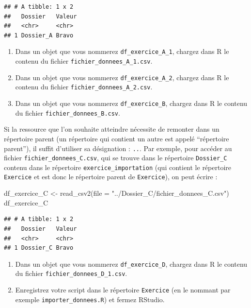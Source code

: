 \documentclass[
  11pt,
]{book}
\newenvironment{Shaded}{\begin{snugshade}}{\end{snugshade}}
\newcommand{\AttributeTok}[1]{\textcolor[rgb]{0.77,0.63,0.00}{#1}}
\newcommand{\FunctionTok}[1]{\textcolor[rgb]{0.00,0.00,0.00}{#1}}
\newcommand{\NormalTok}[1]{#1}
\newcommand{\OtherTok}[1]{\textcolor[rgb]{0.56,0.35,0.01}{#1}}
\newcommand{\StringTok}[1]{\textcolor[rgb]{0.31,0.60,0.02}{#1}}
\providecommand{\tightlist}{%
  \setlength{\itemsep}{0pt}\setlength{\parskip}{0pt}}
\numberwithin{equation}{section}
\numberwithin{countremarque}{section}
\newenvironment{greenbox}{
  \begin{tcolorbox}[breakable, colback=vert,coltext=black,
                  colframe=grisfonce]}
 {\end{tcolorbox}}
\begin{document}
\begin{lstlisting}
## # A tibble: 1 x 2
##   Dossier   Valeur
##   <chr>     <chr> 
## 1 Dossier_A Bravo
\end{lstlisting}

\begin{greenbox}

\begin{enumerate}
\def\labelenumi{\arabic{enumi}.}
\setcounter{enumi}{6}
\tightlist
\item
  Dans un objet que vous nommerez \texttt{df\_exercice\_A\_1}, chargez dans R le contenu du fichier \texttt{fichier\_donnees\_A\_1.csv}.
\item
  Dans un objet que vous nommerez \texttt{df\_exercice\_A\_2}, chargez dans R le contenu du fichier \texttt{fichier\_donnees\_A\_2.csv}.
\item
  Dans un objet que vous nommerez \texttt{df\_exercice\_B}, chargez dans R le contenu du fichier \texttt{fichier\_donnees\_B.csv}.
\end{enumerate}

\end{greenbox}

Si la ressource que l'on souhaite atteindre nécessite de remonter dans un répertoire parent (un répertoire qui contient un autre est appelé ``répertoire parent''), il suffit d'utiliser sa désignation : \texttt{..}. Par exemple, pour accéder au fichier \texttt{fichier\_donnees\_C.csv}, qui se trouve dans le répertoire \texttt{Dossier\_C} contenu dans le répertoire \texttt{exercice\_importation} (qui contient le répertoire \texttt{Exercice} et est donc le répertoire parent de \texttt{Exercice}), on peut écrire :

\begin{Shaded}
\begin{Highlighting}[]
\NormalTok{df\_exercice\_C }\OtherTok{\textless{}{-}} \FunctionTok{read\_csv2}\NormalTok{(}\AttributeTok{file =} \StringTok{"../Dossier\_C/fichier\_donnees\_C.csv"}\NormalTok{)}
\NormalTok{df\_exercice\_C}
\end{Highlighting}
\end{Shaded}

\begin{lstlisting}
## # A tibble: 1 x 2
##   Dossier   Valeur
##   <chr>     <chr> 
## 1 Dossier_C Bravo
\end{lstlisting}

\begin{greenbox}

\begin{enumerate}
\def\labelenumi{\arabic{enumi}.}
\setcounter{enumi}{9}
\tightlist
\item
  Dans un objet que vous nommerez \texttt{df\_exercice\_D}, chargez dans R le contenu du fichier \texttt{fichier\_donnees\_D\_1.csv}.
\item
  Enregistrez votre script dans le répertoire \texttt{Exercice} (en le nommant par exemple \texttt{importer\_donnees.R}) et fermez RStudio.
\end{enumerate}

\end{greenbox}
\end{document}
